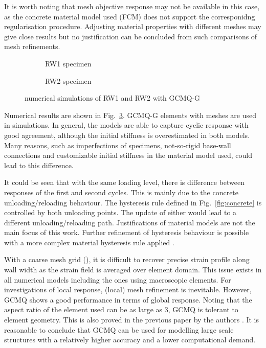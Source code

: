 \documentclass[3p,review,sort&compress,11pt,fleqn]{elsarticle}
\newcommand*{\figref}[1]{Fig.~\ref{#1}}
\begin{document}
It is worth noting that mesh objective response may not be available in this case, as the concrete material model used (FCM) does not support the corresponidng regularisation procedure. Adjusting material properties with different meshes may give close results but no justification can be concluded from such comparisons of mesh refinements.

\begin{figure}[htb]
\scriptsize\centering
\begin{subfigure}[b]{0.48\textwidth}

\caption{RW1 specimen}\label{fig:rw1_pushover}
\end{subfigure}\quad
\begin{subfigure}[b]{0.48\textwidth}

\caption{RW2 specimen}\label{fig:rw2_pushover}
\end{subfigure}
\caption{numerical simulations of RW1 and RW2 with GCMQ-G}\label{fig:thomsen_wall}
\end{figure}
Numerical results are shown in \figref{fig:thomsen_wall}. GCMQ-G elements with  meshes are used in simulations. In general, the models are able to capture cyclic response with good agreement, although the initial stiffness is overestimated in both models. Many reasons, such as imperfections of specimens, not-so-rigid base-wall connections and customizable initial stiffness in the material model used, could lead to this difference.

It could be seen that with the same loading level, there is difference between responses of the first and second cycles. This is mainly due to the concrete unloading/reloading behaviour. The hysteresis rule defined in \figref{fig:concrete} is controlled by both unloading points. The update of either would lead to a different unloading/reloading path. Justifications of material models are not the main focus of this work. Further refinement of hysteresis behaviour is possible with a more complex material hysteresis rule applied \citep[e.g.,][]{Chang1994}.

With a coarse mesh grid (), it is difficult to recover precise strain profile along wall width as the strain field is averaged over element domain. This issue exists in all numerical models including the ones using macroscopic elements. For investigations of local response, (local) mesh refinement is inevitable. However, GCMQ shows a good performance in terms of global response. Noting that the aspect ratio of the element used can be as large as \num{3}, GCMQ is tolerant to element geometry. This is also proved in the previous paper by the authors \citep{Chang2019}. It is reasonable to conclude that GCMQ can be used for modelling large scale structures with a relatively higher accuracy and a lower computational demand.
\end{document}
